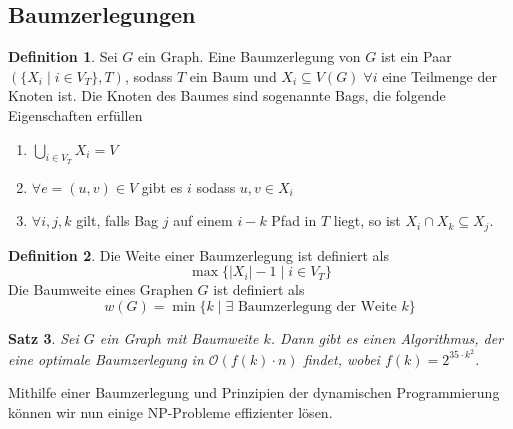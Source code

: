\documentclass[a4paper, 12pt]{article}
\theoremstyle{plain}
\newtheorem{theorem}{Satz}[section] %
\theoremstyle{definition}
\newtheorem{definition}[theorem]{Definition} %
\theoremstyle{lemma}
\theoremstyle{remark}
\theoremstyle{corollary}
\theoremstyle{example}
\begin{document}
\subsection{Baumzerlegungen}
	\begin{definition}
		Sei $G$ ein Graph. Eine Baumzerlegung von $G$ ist ein Paar $(\{X_i \mid i \in V_T\}, T)$, sodass $T$ ein Baum und $X_i \subseteq V(G) \; \forall i$ eine Teilmenge der Knoten ist. Die Knoten des Baumes sind sogenannte Bags, die folgende Eigenschaften erfüllen
		\begin{enumerate}
			\item $\bigcup_{i\in V_T} X_i = V$
			\item $\forall e = (u,v) \in V$ gibt es $i$ sodass $u,v \in X_i$
			\item $\forall i,j,k$ gilt, falls Bag $j$ auf einem $i-k$ Pfad in $T$ liegt, so ist $X_i \cap X_k \subseteq X_j$.
		\end{enumerate}
	\end{definition}
	\begin{definition}
		Die Weite einer Baumzerlegung ist definiert als \[\max\{\left|X_i\right|-1 \mid i \in V_T\}\]
		Die Baumweite eines Graphen $G$ ist definiert als \[w(G) = \min\{k \mid \exists \text{ Baumzerlegung der Weite } k\}\] 
	\end{definition}
	\begin{theorem}
		Sei $G$ ein Graph mit Baumweite $k$. Dann gibt es einen Algorithmus, der eine optimale Baumzerlegung in $\mathcal{O}(f(k)\cdot n)$ findet, wobei $f(k) = 2^{35\cdot k^2}$.
	\end{theorem}
	Mithilfe einer Baumzerlegung und Prinzipien der dynamischen Programmierung können wir nun einige NP-Probleme effizienter lösen.\\
	
\end{document}
